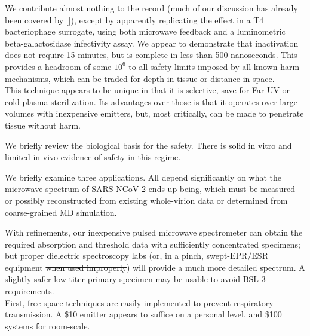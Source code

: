 \documentclass[paper.tex]{subfiles}
\begin{document}
\begin{multicols}{1}
We contribute almost nothing to the record (much of our discussion has already been covered by []), except by apparently replicating the effect in a T4 bacteriophage surrogate, using both microwave feedback and a luminometric beta-galactosidase infectivity assay. We appear to demonstrate that inactivation does not require 15 minutes, but is complete in less than 500 nanoseconds. This provides a headroom of some $10^6$ to all safety limits imposed by all known harm mechanisms, which can be traded for depth in tissue or distance in space. \\

This technique appears to be unique in that it is selective, save for Far UV or cold-plasma sterilization. Its advantages over those is that it operates over large volumes with inexpensive emitters, but, most critically, can be made to penetrate tissue without harm.

We briefly review the biological basis for the safety. There is solid in vitro and limited in vivo evidence of safety in this regime.


We briefly examine three applications. All depend significantly on what the microwave spectrum of SARS-NCoV-2 ends up being, which must be measured - or possibly reconstructed from existing whole-virion data or determined from coarse-grained MD simulation. 

With refinements, our inexpensive pulsed microwave spectrometer can obtain the required absorption and threshold data with sufficiently concentrated specimens; but proper dielectric spectroscopy labs (or, in a pinch, swept-EPR/ESR equipment \st{when used improperly}) will provide a much more detailed spectrum. A slightly safer low-titer primary specimen may be usable to avoid BSL-3 requirements. \\



First, free-space techniques are easily implemented to prevent respiratory transmission. A \$10 emitter appears to suffice on a personal level, and \$100 systems for room-scale.\\


\end{multicols}
\end{document}
